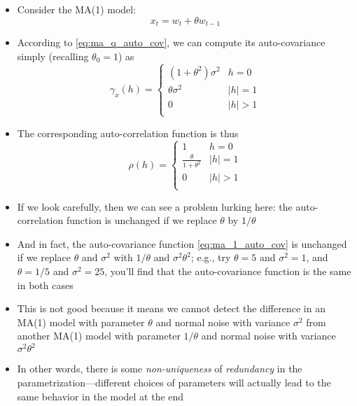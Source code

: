 \documentclass{article}
\begin{document}
\begin{itemize}
\item Consider the MA(1) model:
  \begin{equation}
  \label{eq:ma_1}
  x_t = w_t + \theta w_{t-1}
  \end{equation}

\item According to \eqref{eq:ma_q_auto_cov}, we can compute its auto-covariance 
  simply (recalling $\theta_0 = 1$) as
  \begin{equation}
  \label{eq:ma_1_auto_cov}  
  \gamma_x(h) = \begin{cases}
  (1+\theta^2) \sigma^2 & h = 0 \\
  \theta \sigma^2 & |h| = 1 \\
  0 & |h| > 1 \\
  \end{cases}
  \end{equation}

\item The corresponding auto-correlation function is thus
  \[
  \rho(h) = \begin{cases}
  1 & h = 0 \\
  \frac{\theta}{1+\theta^2} & |h| = 1 \\ 
  0 & |h| > 1 \\
  \end{cases}
  \]

\item If we look carefully, then we can see a problem lurking here: the
  auto-correlation function is unchanged if we replace $\theta$ by $1/\theta$

\item And in fact, the auto-covariance function \eqref{eq:ma_1_auto_cov} is
  unchanged if we replace $\theta$ and $\sigma^2$ with $1/\theta$ and $\sigma^2
  \theta^2$; e.g., try $\theta = 5$ and $\sigma^2 = 1$, and $\theta = 1/5$ and
  $\sigma^2 = 25$, you'll find that the auto-covariance function is the same in
  both cases 

\item This is not good because it means we cannot detect the difference in an
  MA(1) model with parameter $\theta$ and normal noise with variance $\sigma^2$ 
  from another MA(1) model with parameter $1/\theta$ and normal noise with
  variance $\sigma^2 \theta^2$

\item In other words, there is some \emph{non-uniqueness} of \emph{redundancy}
  in the parametrization---different choices of parameters will actually lead to
  the same behavior in the model at the end


\end{itemize}
\end{document}

